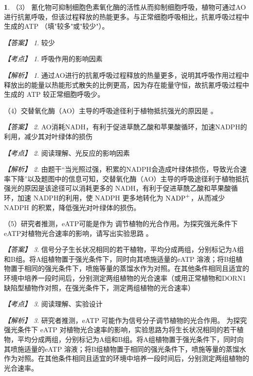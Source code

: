 \documentclass[UTF8, 10pt, a4paper, oneside]{ctexart}
\newcommand{\blank}{ \underbar{\quad$\blacktriangle$\quad} }%
\theoremstyle{definition}
\newtheorem{exercise}{}
\theoremstyle{remark}
\newtheorem*{answer}{【答案】}
\newtheorem*{point}{【考点】}      %
\newtheorem*{explanation}{【解析】}     %
\theoremstyle{plain}
\begin{document}
\begin{exercise}
（3） 氰化物可抑制细胞色素氧化酶的活性从而抑制细胞呼吸，植物可通过AO进行抗氰呼吸，但该过程释放的热能更多。与正常细胞呼吸相比，抗氰呼吸过程中生成的ATP\blank（填"较多"或"较少"）。

\begin{answer}
    较少
\end{answer}
\begin{point}
    呼吸作用的影响因素
\end{point}
\begin{explanation}
    通过AO进行的抗氰呼吸过程释放的热量更多，说明其呼吸作用过程中释放出的能量以热能形式散失的比例更高，因为存在能量守恒，故抗氰呼吸过程中生成的 ATP 较正常细胞呼吸少。
\end{explanation}

（4）交替氧化酶（AO）主导的呼吸途径利于植物抵抗强光的原因是\blank。

\begin{answer}
    AO消耗NADH，有利于促进草酰乙酸和苹果酸循环，加速NADPH的利用，减少其对叶绿体的损伤
\end{answer}
\begin{point}
    阅读理解、光反应的影响因素
\end{point}
\begin{explanation}
    由题干“当光照过强，积累的NADPH会造成叶绿体损伤，导致光合速率下降”以及题图中的信息可知，交替氧化酶（AO）主导的呼吸途径利于植物抵抗强光的原因是该途径可以消耗更多的 NADH，有利于促进草酰乙酸和苹果酸循环，加速 NADPH的利用，使 NADPH 更多地转化为 $\ce{NADP+}$，从而减少 NADPH 的积累，降低强光对叶绿体的损伤。
\end{explanation}

（5）研究者推测，eATP可能是作为\blank 调节植物的光合作用。为探究强光条件下eATP对植物光合速率的影响，请写出实验思路\blank。

\begin{answer}
    信号分子\qquad 生长状况相同的若干植物，平均分成两组，分别标记为A组和B组。将A组植物置于强光条件下，同时向其喷施适量的eATP 溶液；将B组植物置于相同的强光条件下，喷施等量的蒸馏水作为对照。在其他条件相同且适宜的环境中培养一段时间后，分别测定两组植物的光合速率（或用正常植物和DORN1缺陷型植物作对照，在强光条件下，测定两组植物的光合速率）
\end{answer}
\begin{point}
    阅读理解、实验设计
\end{point}
\begin{explanation}
    研究者推测，eATP 可能作为信号分子调节植物的光合作用。
为探究强光条件下 eATP 对植物光合速率的影响，实验思路为将生长状况相同的若干植物，平均分成两组，分别标记为A组和B组。将A组植物置于强光条件下，同时向其喷施适量的eATP 溶液；将B组植物置于相同的强光条件下，喷施等量的蒸馏水作为对照。在其他条件相同且适宜的环境中培养一段时间后，分别测定两组植物的光合速率。


\end{explanation}

\end{exercise}
\end{document}
